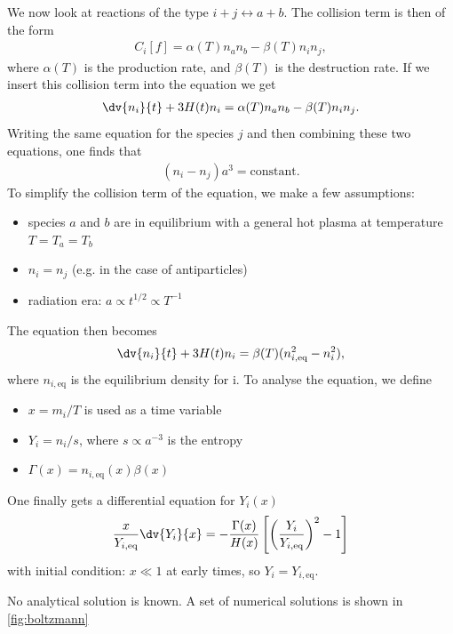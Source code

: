 We now look at reactions of the type $i + j \leftrightarrow a + b$. The collision term is then of the form
\begin{align*}
	C_i[f] = \alpha(T) n_a n_b - \beta(T) n_i n_j,
\end{align*}
where $\alpha(T)$ is the production rate, and $\beta(T)$ is the destruction rate.
If we insert this collision term into the equation we get
\begin{align*}
	\dv{n_i}{t} + 3 H(t) n_i = \alpha(T) n_a n_b - \beta(T) n_i n_j. 
\end{align*}
Writing the same equation for the species $j$ and then combining these two equations, one finds that
\begin{align*}
	(n_i - n_j)a^3 = \text{constant}. 
\end{align*}
To simplify the collision term of the equation, we make a few assumptions:
\begin{itemize}
	\item species $a$ and $b$ are in equilibrium with a general hot plasma at temperature $T = T_a = T_b$
	\item $n_i = n_j$ (e.g. in the case of antiparticles)
	\item radiation era: $a \propto t^{1/2} \propto T^{-1}$
\end{itemize}
The equation then becomes
\begin{align*}
	\dv{n_i}{t} + 3 H(t) n_i = \beta(T) (n_{i, \text{eq}}^2 - n_i^2), 
\end{align*}
where $n_{i, \text{eq}}$ is the equilibrium density for i. 
To analyse the equation, we define
\begin{itemize}
	\item $x = m_i/T$ is used as a time variable
	\item $Y_i = n_i/s$, where $s \propto a^{-3}$ is the entropy
	\item $\Gamma(x) = n_{i, \text{eq}}(x) \beta(x)$
\end{itemize}
One finally gets a differential equation for $Y_i(x)$
\begin{align*}
	\frac{x}{Y_{i, \text{eq}}} \dv{Y_i}{x} = - \frac{\Gamma(x)}{H(x)} \left[ \left( \frac{Y_i}{Y_{i,\text{eq}}} \right)^2 - 1 \right]
\end{align*}
with initial condition: $x \ll 1$ at early times, so $Y_i = Y_{i, \text{eq}}$.

No analytical solution is known. A set of numerical solutions is shown in \cref{fig:boltzmann}

